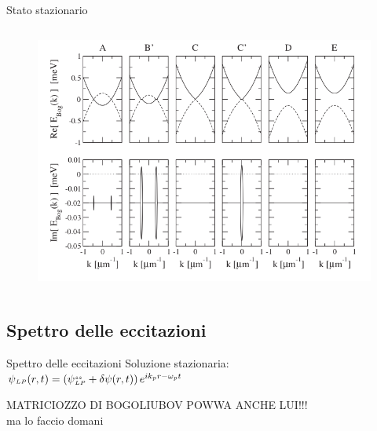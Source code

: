 \documentclass[10pt]{beamer}
\begin{document}
\begin{frame}{Stato stazionario}
\begin{columns}[t]
 \begin{column}{.5\textwidth}
  \begin{figure}
   \includegraphics[width=\columnwidth]{files/Spectra.png}
  \end{figure}
 \end{column}

\end{columns}


\end{frame}


\subsection{Spettro delle eccitazioni}
\begin{frame}{Spettro delle eccitazioni}
Soluzione stazionaria: \( \psi{\scriptstyle _{LP}}(r,t) = \left(\psi{\scriptstyle ^{ss}_{LP}} + \delta\psi (r,t) \right)e^{ik_pr - \omega_p t} \)

MATRICIOZZO DI BOGOLIUBOV \alert{POWWA ANCHE LUI!!!}\\
ma lo faccio domani
\end{frame}
\end{document}
